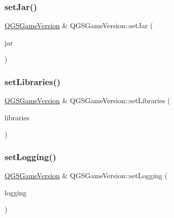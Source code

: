 \mbox{\label{class_q_g_s_game_version_afc34ab6f00d4703adab5bed636b332cb}} 
\subsubsection{\texorpdfstring{set\+Jar()}{setJar()}}
{\footnotesize\ttfamily \mbox{\hyperlink{class_q_g_s_game_version}{Q\+G\+S\+Game\+Version}} \& Q\+G\+S\+Game\+Version\+::set\+Jar (\begin{DoxyParamCaption}\item[{const Q\+String \&}]{jar }\end{DoxyParamCaption})}

\mbox{\label{class_q_g_s_game_version_aff97722ab157feb2a51d416027e05d63}} 
\subsubsection{\texorpdfstring{set\+Libraries()}{setLibraries()}}
{\footnotesize\ttfamily \mbox{\hyperlink{class_q_g_s_game_version}{Q\+G\+S\+Game\+Version}} \& Q\+G\+S\+Game\+Version\+::set\+Libraries (\begin{DoxyParamCaption}\item[{const Q\+List$<$ \mbox{\hyperlink{class_q_g_s_library}{Q\+G\+S\+Library}} $>$ \&}]{libraries }\end{DoxyParamCaption})}

\mbox{\label{class_q_g_s_game_version_a0afd6d492b0e46c8d7b52bcd8bdfe822}} 
\subsubsection{\texorpdfstring{set\+Logging()}{setLogging()}}
{\footnotesize\ttfamily \mbox{\hyperlink{class_q_g_s_game_version}{Q\+G\+S\+Game\+Version}} \& Q\+G\+S\+Game\+Version\+::set\+Logging (\begin{DoxyParamCaption}\item[{const Q\+Map$<$ Q\+String, \mbox{\hyperlink{class_q_g_s_logging}{Q\+G\+S\+Logging}} $>$ \&}]{logging }\end{DoxyParamCaption})}

